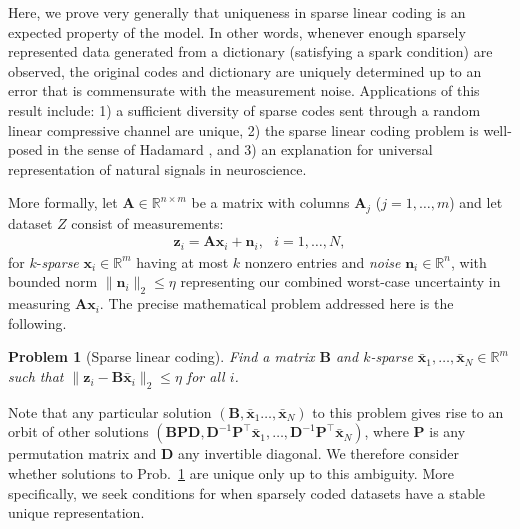 \documentclass[9pt,twocolumn]{pnas-new}
\newtheorem{problem}{Problem}
\begin{document}
Here, we prove very generally that uniqueness in sparse linear coding is an expected property of the model.  In other words, whenever enough sparsely represented data generated from a dictionary (satisfying a spark condition) are observed, the original codes and dictionary are uniquely determined up to an error that is commensurate with the measurement noise.  Applications of this result include:  1) a sufficient diversity of sparse codes sent through a random linear compressive channel are unique, 2) the sparse linear coding problem is well-posed in the sense of Hadamard \cite{Hadamard1902}, and 3) an explanation for universal representation of natural signals in neuroscience. 

More formally, let $\mathbf{A} \in \mathbb R^{n \times m}$ be a matrix with columns $\mathbf{A}_j$ ($j = 1,\ldots,m$) and let dataset $Z$ consist of measurements:
\begin{align}\label{LinearModel}
\mathbf{z}_i = \mathbf{A}\mathbf{x}_i + \mathbf{n}_i,\ \ \  \text{$i=1,\ldots,N$},
\end{align}
for $k$-\emph{sparse} $\mathbf{x}_i \in \mathbb{R}^m$ having at most $k$ nonzero entries and \emph{noise} $\mathbf{n}_i \in \mathbb{R}^n$, with bounded norm $\| \mathbf{n}_i \|_2 \leq  \eta$ representing our combined worst-case uncertainty in  measuring $\mathbf{A}\mathbf{x}_i$.
The precise mathematical problem addressed here is the following.

\begin{problem}[Sparse linear coding]\label{InverseProblem}
Find a matrix $\mathbf{B}$ and $k$-sparse $\mathbf{\bar x}_1, \ldots, \mathbf{\bar x}_N \in \mathbb{R}^m$ such that $\|\mathbf{z}_i - \mathbf{B}\mathbf{\bar x}_i\|_2 \leq \eta$ for all $i$.
\end{problem}

Note that any particular solution $(\mathbf{B}, \mathbf{\bar x}_1 \ldots, \mathbf{\bar x}_N)$ to this problem gives rise to an orbit of other solutions $(\mathbf{BPD}, \mathbf{D}^{-1}\mathbf{P}^{\top}\mathbf{\bar x}_1, \ldots, \mathbf{D}^{-1}\mathbf{P}^{\top}\mathbf{\bar x}_N)$, where $\mathbf{P}$ is any permutation matrix and $\mathbf{D}$ any invertible diagonal.  
We therefore consider whether solutions to Prob.~\ref{InverseProblem} are unique only up to this ambiguity.  More specifically, 
we seek conditions for when sparsely coded datasets have a stable unique representation.
\end{document}
